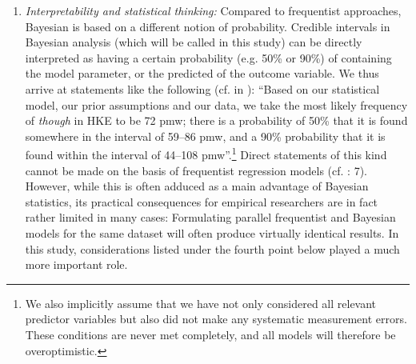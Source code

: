 \begin{enumerate}
\item\sloppy \textit{Interpretability and statistical thinking:} Compared to frequentist approaches, Bayesian  is based on a different notion of probability. Credible intervals in Bayesian analysis (which will be called \textit{} in this study) can be directly interpreted as having a certain probability (e.g. 50\% or 90\%) of containing the model parameter, or the predicted  of the outcome variable. We thus arrive at statements like the following (cf.  in ): “Based on our statistical model, our prior assumptions and our data, we take the most likely frequency of \textit{though} in HKE to be 72 pmw; there is a probability of 50\% that it is found somewhere in the interval of 59–86 pmw, and a 90\% probability that it is found within the interval of 44–108 pmw”.\footnote{We also implicitly assume that we have not only considered all relevant predictor variables but also did not make any systematic measurement errors. These conditions are never met completely, and all models will therefore be overoptimistic.} Direct statements of this kind cannot be made on the basis of frequentist regression models (cf. \citealt{BolstadCurran2017}: 7). However, while this is often adduced as a main advantage of Bayesian statistics, its practical consequences for empirical researchers are in fact rather limited in many cases: Formulating parallel frequentist and Bayesian models for the same dataset will often produce virtually identical results. In this study, considerations listed under the fourth point below played a much more important role.


\end{enumerate}
